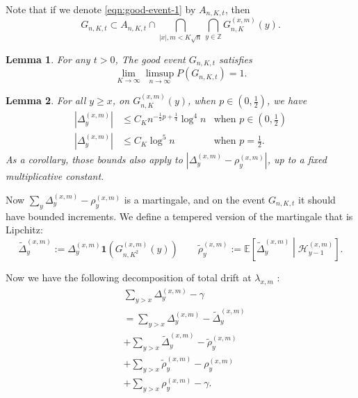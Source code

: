 \documentclass[twoside,12pt,a4paper]{article}
\newtheorem{lemma}{Lemma}[section]
\numberwithin{equation}{section}
\begin{document}
Note that  if we denote \eqref{eqn:good-event-1} by $A_{n, K, t}$, then
	\begin{equation}
		\label{eqn:goodgood}
		G_{n, K, t} \subset  A_{n, K, t} \cap 
		\bigcap_{|x|, m < K \sqrt{n} } \bigcap_{y \in \mathbb{Z}} G_{n, K}^{(x,m)}(y)
	.\end{equation} 

\begin{lemma}
	\label{lem:good-event}
	For any $t > 0$, The good event $G_{n,K,t}$ satisfies
	\[
		\lim_{K \to \infty } \limsup_{n \to \infty } 
		P(G_{n, K,t}) = 1
	.\] 
\end{lemma}



\begin{lemma}\label{lm:lipchitz-bound-on-good-event}
	For all  $y \ge x$, on $G_{n, K}^{(x,m)}(y)$, when $p \in (0,\frac{1}{2})$,  we have
	\begin{align*}
		\left| \Delta_y^{(x,m)} \right| &\le C_K n^{-\frac{1}{2}p + \frac{1}{4}} \log^4 n &\text{when }p \in \left(0,\frac{1}{2}\right)\\
		\left| \Delta_y^{(x,m)} \right| &\le C_K \log^5 n &\text{when }p = \frac{1}{2}
	.\end{align*}
	As a corollary, those bounds also apply to $\left| \Delta_y^{(x,m)} - \rho_y^{(x,m)} \right| $, up to a fixed multiplicative constant.
\end{lemma}

Now $\sum_y \Delta_y^{(x,m)} - \rho_y^{(x,m)}$ is a martingale, and on the event $G_{n, K, t}$ it should have bounded increments. We define a tempered version of the martingale that is Lipchitz:
\[
	\tilde \Delta_y^{(x,m)} := \Delta_y ^{(x,m)} \mathbf{1}\left( G_{n, K^2}^{(x,m)} (y)\right) \qquad
	\tilde \rho_y^{(x,m)} := \mathbb{E}\left[ \tilde\Delta_y^{(x,m)} \middle| \mathcal{H}_{y-1}^{(x,m)} \right]  
.\] 

Now we have the following decomposition of total drift at $\lambda_{x, m}$ :
\begin{align}
	&\sum_{y > x} \Delta_y^{(x,m)} - \gamma \\
	\label{eqn:tempered-difference-1}
	&= \sum_{y > x} \Delta_y^{(x,m)} - \tilde\Delta_y^{(x,m)} \\
	\label{eqn:tempered-difference-2}
	&+ \sum_{y > x} \tilde \Delta_{y}^{(x,m)} - \tilde\rho_y^{(x,m)} \\
	\label{eqn:tempered-difference-3}
	&+ \sum_{y > x} \tilde\rho_y^{(x,m)} - \rho_y^{(x,m)} \\
	\label{eqn:tempered-difference-4}
	&+ \sum_{y > x} \rho_y^{(x,m)} - \gamma
.\end{align}
\end{document}
